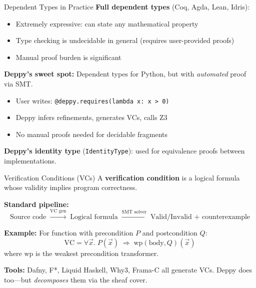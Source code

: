 \documentclass[aspectratio=169,10pt]{beamer}
\begin{document}
\begin{frame}{Dependent Types in Practice}
\textbf{Full dependent types} (Coq, Agda, Lean, Idris):
\begin{itemize}
  \item Extremely expressive: can state any mathematical property
  \item Type checking is undecidable in general (requires user-provided proofs)
  \item Manual proof burden is significant
\end{itemize}

\vspace{0.5em}
\textbf{Deppy's sweet spot:} Dependent types for Python, but with \emph{automated} proof via SMT.
\begin{itemize}
  \item User writes: \texttt{@deppy.requires(lambda x: x > 0)}
  \item Deppy infers refinements, generates VCs, calls Z3
  \item No manual proofs needed for decidable fragments
\end{itemize}

\vspace{0.3em}
\textbf{Deppy's identity type} (\texttt{IdentityType}): used for equivalence proofs between implementations.
\end{frame}

\begin{frame}{Verification Conditions (VCs)}
A \textbf{verification condition} is a logical formula whose validity implies program correctness.

\vspace{0.3em}
\textbf{Standard pipeline:}
\[
\text{Source code} \;\xrightarrow{\text{VC gen}}\; \text{Logical formula}
\;\xrightarrow{\text{SMT solver}}\; \text{Valid/Invalid + counterexample}
\]

\vspace{0.3em}
\textbf{Example:} For function with precondition $P$ and postcondition $Q$:
\[
\text{VC} = \forall \vec{x}.\; P(\vec{x}) \;\Rightarrow\; \text{wp}(\text{body}, Q)(\vec{x})
\]
where $\text{wp}$ is the weakest precondition transformer.

\vspace{0.3em}
\textbf{Tools:} Dafny, F*, Liquid Haskell, Why3, Frama-C all generate VCs.
Deppy does too---but \emph{decomposes} them via the sheaf cover.
\end{frame}
\end{document}
